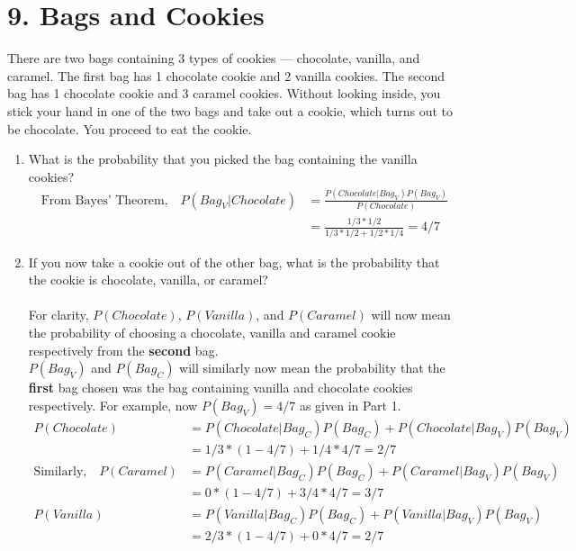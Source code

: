 \documentclass[11pt]{report}
\begin{document}
\section*{9. Bags and Cookies}
There are two bags containing 3 types of cookies — chocolate, vanilla, and caramel. The first bag
has 1 chocolate cookie and 2 vanilla cookies. The second bag has 1 chocolate cookie and 3
caramel cookies. Without looking inside, you stick your hand in one of the two bags and take out a
cookie, which turns out to be chocolate. You proceed to eat the cookie. 
\begin{enumerate}
	\item What is the probability that you picked the bag containing the vanilla cookies?\begin{align*}
\text{From Bayes' Theorem,} \quad P(Bag_V|Chocolate) &= \frac{P(Chocolate |Bag_V)P(Bag_V)}{P(Chocolate)} \\
&= \frac{1/3*1/2}{1/3*1/2 + 1/2*1/4}= 4/7	
 \end{align*}
	\item If you now take a cookie out of the other bag, what is the probability that the cookie is
chocolate, vanilla, or caramel?	\\ \\  For clarity, $P(Chocolate)$, $P(Vanilla)$, and $P(Caramel)$ will now mean the probability of choosing a chocolate, vanilla and caramel cookie respectively from the \textbf{second} bag. \\$P(Bag_V)$ and $P(Bag_C)$ will similarly now mean the probability that the \textbf{first} bag chosen was the bag containing vanilla and chocolate cookies respectively.  For example, now $P(Bag_V) = 4/7$ as given in Part 1.   \begin{align*}
P(Chocolate) &= P(Chocolate|Bag_C)P(Bag_C ) + P(Chocolate|Bag_V)P(Bag_V)\\
&= 1/3*(1-4/7) + 1/4*4/7 = 2/7\\
\text{Similarly,} \quad P(Caramel) &= P(Caramel|Bag_C)P(Bag_C ) + P(Caramel|Bag_V)P(Bag_V)\\
&= 0*(1-4/7) + 3/4*4/7 = 3/7\\
P(Vanilla) &= P(Vanilla|Bag_C)P(Bag_C ) + P(Vanilla|Bag_V)P(Bag_V)\\
&= 2/3*(1-4/7) + 0*4/7 = 2/7\\
\end{align*}
 


\end{enumerate}
\end{document}
